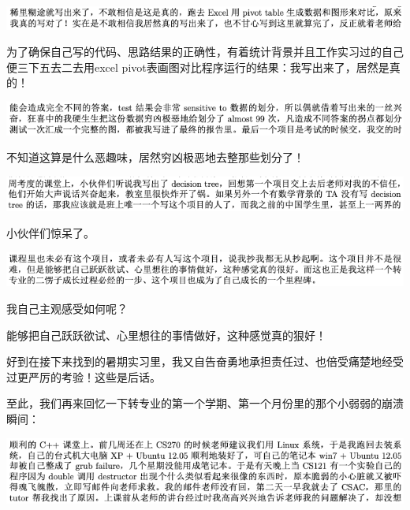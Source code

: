 \documentclass[9pt, b5paper]{article}
\begin{document}
\begin{center}
\includegraphics[width=.9\linewidth]{./pic/backups_plans_20210504_115408.png}
\end{center}

为了确保自己写的代码、思路结果的正确性，有着统计背景并且工作实习过的自己便三下五去二去用excel pivot表画图对比程序运行的结果：我写出来了，居然是真的！

\begin{center}
\includegraphics[width=.9\linewidth]{./pic/backups_plans_20210504_115700.png}
\end{center}

不知道这算是什么恶趣味，居然穷凶极恶地去整那些划分了！　

\begin{center}
\includegraphics[width=.9\linewidth]{./pic/backups_plans_20210504_115836.png}
\end{center}

小伙伴们惊呆了。

\begin{center}
\includegraphics[width=.9\linewidth]{./pic/backups_plans_20210504_115915.png}
\end{center}

我自己主观感受如何呢？

能够把自己跃跃欲试、心里想往的事情做好，这种感觉真的狠好！

好到在接下来找到的暑期实习里，我又自告奋勇地承担责任过、也倍受痛楚地经受过更严厉的考验！这些是后话。 

至此，我们再来回忆一下转专业的第一个学期、第一个月份里的那个小弱弱的崩溃瞬间：

\begin{center}
\includegraphics[width=.9\linewidth]{./pic/backups_plans_20210501_214324.png}
\end{center}
\end{document}
